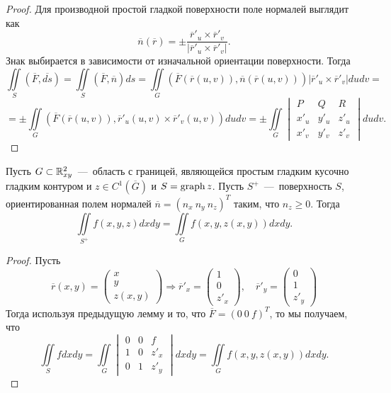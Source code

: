\begin{proof}
    Для производной простой гладкой поверхности поле нормалей выглядит как \[\overline{n}(\overline{r}) = \pm\dfrac{\overline{r}'_u \times \overline{r}'_v}{|\overline{r}'_u \times \overline{r}'_v|}.\]
    Знак выбирается в зависимости от изначальной ориентации поверхности. Тогда \[
    \iint\limits_S (\overline{F}, \overline{ds}) = \iint\limits_{S}(\overline{F}, \overline{n})ds = \iint\limits_G (\overline{F}(\overline{r}(u, v)), \overline{n}(\overline{r}(u, v)))|\overline{r}'_u \times \overline{r}'_v|dudv = \]\[ =  \pm\iint\limits_G (\overline{F}(\overline{r}(u, v)), \overline{r}'_u(u, v) \times \overline{r}'_v(u, v))dudv = \pm \iint\limits_G \begin{vmatrix}
        P & Q & R \\ x'_u & y'_u & z'_u \\ x'_v & y'_v & z'_v
    \end{vmatrix} dudv.
    \]
\end{proof}
\hypertarget{graph_gaus}{}
\begin{theorem}
    Пусть $G \subset \mathbb{R}^2_{xy}$~---~область с границей, являющейся простым гладким кусочно гладким контуром и $z \in C^1(\overline{G})$ и $S = \operatorname{graph} z$. Пусть $S^+$~---~поверхность $S$, ориентированная полем нормалей $\overline{n} = (n_x \  n_y \  n_z)^T$ таким, что $n_z \geq 0$. Тогда \[
    \iint\limits_{S^+} f(x, y, z)dxdy = \iint\limits_G f(x, y, z(x, y))dxdy.
    \]
\end{theorem}
\begin{proof}
    Пусть \begin{equation*}
        \overline{r}(x, y) = \begin{pmatrix}
            x \\ y \\ z(x, y)
        \end{pmatrix} \Rightarrow \overline{r}'_x = \begin{pmatrix}
            1 \\ 0 \\ z'_x
        \end{pmatrix}, \quad \overline{r}'_y = \begin{pmatrix}
            0 \\ 1 \\ z'_y
        \end{pmatrix}
    \end{equation*}
    Тогда используя предыдущую лемму и то, что $\overline{F} = (0 \ 0 \ f)^T$, то мы получаем, что \[
    \iint\limits_S fdxdy = \iint\limits_G \begin{vmatrix}
        0 & 0 & f \\ 1 & 0 & z'_x \\ 0 & 1 & z'_y
    \end{vmatrix}dxdy =  \iint\limits_G f(x, y, z(x, y))dxdy.
    \]
\end{proof}

